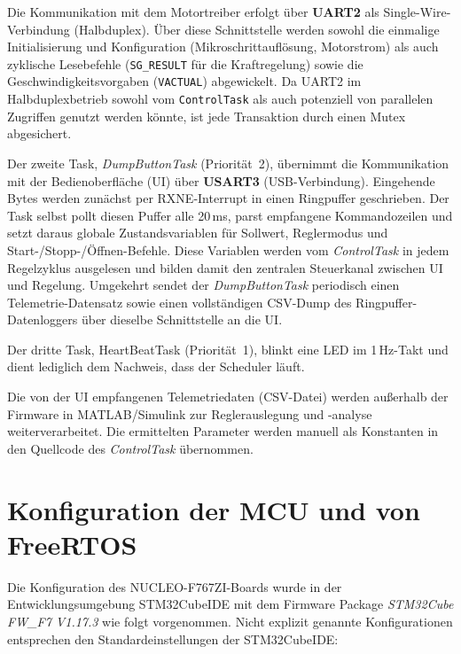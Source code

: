 Die Kommunikation mit dem Motortreiber erfolgt über \textbf{UART2} als Single-Wire-Verbindung (Halbduplex). Über diese Schnittstelle werden sowohl die einmalige Initialisierung und Konfiguration (Mikroschrittauflösung, Motorstrom) als auch zyklische Lesebefehle (\texttt{SG\_RESULT} für die Kraftregelung) sowie die Geschwindigkeitsvorgaben (\texttt{VACTUAL}) abgewickelt. Da UART2 im Halbduplexbetrieb sowohl vom \texttt{ControlTask} als auch potenziell von parallelen Zugriffen genutzt werden könnte, ist jede Transaktion durch einen Mutex abgesichert.

Der zweite Task, \textit{DumpButtonTask} (Priorität~2), übernimmt die Kommunikation mit der Bedienoberfläche (UI) über \textbf{USART3} (USB-Verbindung). Eingehende Bytes werden zunächst per RXNE-Interrupt in einen Ringpuffer geschrieben. Der Task selbst pollt diesen Puffer alle 20\,ms, parst empfangene Kommandozeilen und setzt daraus globale Zustandsvariablen für Sollwert, Reglermodus und Start-/Stopp-/Öffnen-Befehle. Diese Variablen werden vom \textit{ControlTask} in jedem Regelzyklus ausgelesen und bilden damit den zentralen Steuerkanal zwischen UI und Regelung. Umgekehrt sendet der \textit{DumpButtonTask} periodisch einen Telemetrie-Datensatz sowie einen vollständigen CSV-Dump des Ringpuffer-Datenloggers über dieselbe Schnittstelle an die UI.

Der dritte Task, \textit{}{HeartBeatTask} (Priorität~1), blinkt eine LED im 1\,Hz-Takt und dient lediglich dem Nachweis, dass der Scheduler läuft.

Die von der UI empfangenen Telemetriedaten (CSV-Datei) werden außerhalb der Firmware in MATLAB/Simulink zur Reglerauslegung und -analyse weiterverarbeitet. Die ermittelten Parameter werden manuell als Konstanten in den Quellcode des \textit{ControlTask} übernommen.




\section{Konfiguration der MCU und von FreeRTOS}
Die Konfiguration des NUCLEO-F767ZI-Boards wurde in der Entwicklungsumgebung STM32CubeIDE mit dem Firmware Package \textit{STM32Cube FW\_F7 V1.17.3} wie folgt vorgenommen. Nicht explizit genannte Konfigurationen entsprechen den Standardeinstellungen der STM32CubeIDE:

